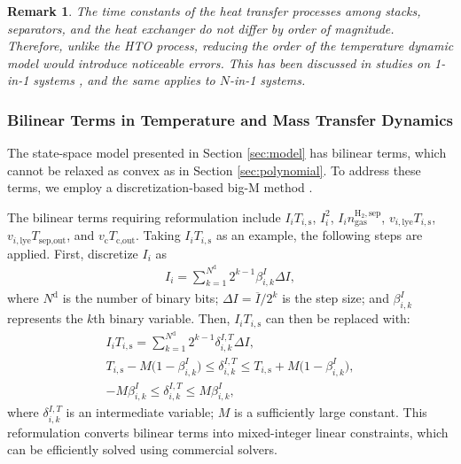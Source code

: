 \documentclass[review,3p,10pt]{elsarticle}
\newtheorem{remark}{Remark}
\begin{document}
\begin{remark}
The time constants of the heat transfer processes among stacks, separators, and the heat exchanger do not differ by order of magnitude. Therefore, unlike the HTO process, reducing the order of the temperature dynamic model would introduce noticeable errors. This has been discussed in studies on 1-in-1 systems \cite{qi2023thermal}, and the same applies to $N$-in-1 systems.
\end{remark}


\subsubsection{Bilinear Terms in Temperature and Mass Transfer Dynamics}
\label{sec:bilinear}

The state-space model presented in Section \ref{sec:model} has bilinear terms, which cannot be relaxed as convex as in Section \ref{sec:polynomial}. To address these terms, we employ a discretization-based big-M method \cite{bemporad1999control}.

The bilinear terms requiring reformulation include $I_i T_{i,\text{s}}$, $I^2_i$, $I_i {n}_{\text{gas}}^{\text{H}_2,\text{sep}}$, $v_{i,\text{lye}} T_{i,\text{s}}$, $v_{i,\text{lye}} T_{\text{sep,out}}$, and $v_{\text{c}} T_{\text{c,out}}$. Taking $I_i T_{i,\text{s}}$ as an example, the following steps are applied. First, discretize $I_i$ as
\begin{align}
  I_i = \sum\nolimits_{k=1}^{N^\text{d}} 2^{k-1} \beta^{I}_{i,k} \Delta I,   \label{eq:idist}
\end{align}
\noindent
where $N^\text{d}$ is the number of binary bits; $\Delta I = \overline{I}/2^{k}$ is the step size; and $\beta^{I}_{i,k}$ represents the $k$th binary variable. Then, $I_i T_{i,\text{s}}$ can then be replaced with:
\begin{gather}
  I_i T_{i,\text{s}} = \sum\nolimits_{k=1}^{N^\text{d}} 2^{k-1} \delta^{I,T}_{i,k} \Delta I,   \label{eq:itdist} \\
  T_{i,\text{s}} - M \big(1- \beta^{I}_{i,k} \big) \le  \delta^{I,T}_{i,k}  \le T_{i,\text{s}} + M  \big(1- \beta^{I}_{i,k} \big), \label{eq:itbigm1} \\
  - M  \beta^{I}_{i,k}  \le  \delta^{I,T}_{i,k}  \le M  \beta^{I}_{i,k} , \label{eq:itbigm2}
\end{gather}
where $\delta^{I,T}_{i,k}$ is an intermediate variable; $M$ is a sufficiently large constant. This reformulation converts bilinear terms into mixed-integer linear constraints, which can be efficiently solved using commercial solvers.
\end{document}
